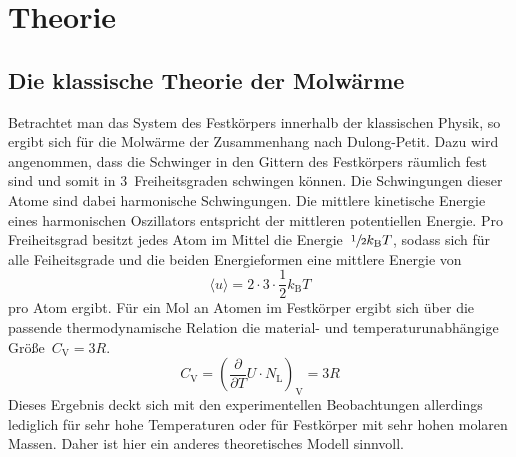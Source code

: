 \section{Theorie}
\label{sec:theorie}
%
\subsection{Die klassische Theorie der Molwärme}
%
Betrachtet man das System des Festkörpers innerhalb der klassischen Physik, so
ergibt sich für die Molwärme der Zusammenhang nach Dulong-Petit. Dazu wird
angenommen, dass die Schwinger in den Gittern des Festkörpers räumlich fest sind
und somit in \num{3}~Freiheitsgraden schwingen können. Die Schwingungen dieser
Atome sind dabei harmonische Schwingungen. Die mittlere kinetische Energie eines
harmonischen Oszillators entspricht der mittleren potentiellen Energie. Pro
Freiheitsgrad besitzt jedes Atom im Mittel die
Energie~$\sfrac{1}{2}k_{\mathrm{B}}T$, sodass sich für alle Feiheitsgrade und
die beiden Energieformen eine mittlere Energie von
%
\begin{equation}
  \langle u\rangle=2\cdot 3\cdot\frac{1}{2}k_{\mathrm{B}}T
\end{equation}
%
pro Atom ergibt. Für ein Mol an Atomen im Festkörper ergibt sich über die
passende thermodynamische Relation die material- und temperaturunabhängige Größe~$C_{\mathrm{V}}=3R$.
%
\begin{equation}
  C_{\mathrm{V}}=\left(\frac{\partial}{\partial T}U\cdot N_{\mathrm{L}}\right)_{\mathrm{V}}=3R
  \label{eq:CV}
\end{equation}
%
Dieses Ergebnis deckt sich mit den experimentellen Beobachtungen allerdings
lediglich für sehr hohe Temperaturen oder für Festkörper mit sehr hohen molaren
Massen. Daher ist hier ein anderes theoretisches Modell sinnvoll.
%

